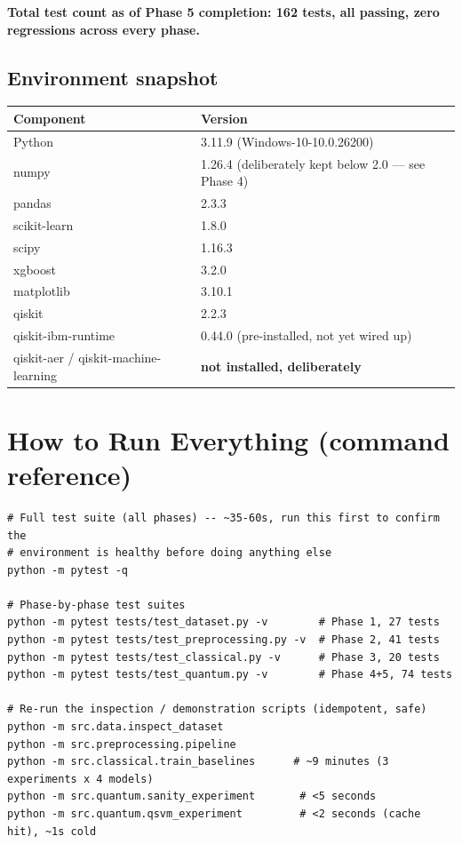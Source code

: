 \documentclass[11pt,a4paper]{article}
\begin{document}
\textbf{Total test count as of Phase 5 completion: 162 tests, all passing, zero regressions across every phase.}

\subsection{Environment snapshot}
\begin{tabularx}{\textwidth}{@{}p{4.4cm}Y@{}}
\toprule
\textbf{Component} & \textbf{Version} \\
\midrule
Python & 3.11.9 (Windows-10-10.0.26200) \\
numpy & 1.26.4 (deliberately kept below 2.0 --- see Phase 4) \\
pandas & 2.3.3 \\
scikit-learn & 1.8.0 \\
scipy & 1.16.3 \\
xgboost & 3.2.0 \\
matplotlib & 3.10.1 \\
qiskit & 2.2.3 \\
qiskit-ibm-runtime & 0.44.0 (pre-installed, not yet wired up) \\
qiskit-aer / qiskit-machine-learning & \textbf{not installed, deliberately} \\
\bottomrule
\end{tabularx}

\section{How to Run Everything (command reference)}

\begin{lstlisting}
# Full test suite (all phases) -- ~35-60s, run this first to confirm the
# environment is healthy before doing anything else
python -m pytest -q

# Phase-by-phase test suites
python -m pytest tests/test_dataset.py -v        # Phase 1, 27 tests
python -m pytest tests/test_preprocessing.py -v  # Phase 2, 41 tests
python -m pytest tests/test_classical.py -v      # Phase 3, 20 tests
python -m pytest tests/test_quantum.py -v        # Phase 4+5, 74 tests

# Re-run the inspection / demonstration scripts (idempotent, safe)
python -m src.data.inspect_dataset
python -m src.preprocessing.pipeline
python -m src.classical.train_baselines      # ~9 minutes (3 experiments x 4 models)
python -m src.quantum.sanity_experiment       # <5 seconds
python -m src.quantum.qsvm_experiment         # <2 seconds (cache hit), ~1s cold
\end{lstlisting}
\end{document}
